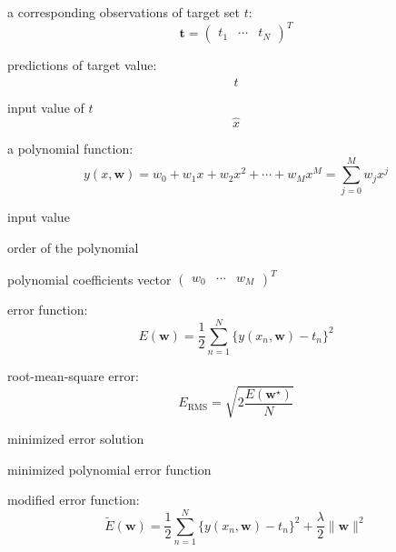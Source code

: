 \documentclass[11pt, a4paper, oneside]{article}
\begin{document}
a corresponding observations of target set $t$:
$$
\mathbf{t}
	= \begin{pmatrix}
	t_1 & \cdots & t_N
\end{pmatrix} ^T 
$$

\bigskip

predictions of target value:
$$
\hat{t}
$$

\bigskip

input value of $\hat{t}$
$$
\hat{x}
$$

\bigskip

a polynomial function:
\begin{equation}
y(x, \mathbf{w})
= w_0 + w_1x + w_2x^2 + \cdots + w_Mx^M
= \sum_{j=0}^M w_j x^j 
\tag{1.1}
\end{equation}

\begin{description}[labelwidth=\widthof{\bfseries 1234567890},align=parright]
	\item[$x:$] input value
	\item[$M:$] order of the polynomial
	\item[$\mathbf{w}:$] polynomial coefficients vector $\begin{pmatrix}
w_0 & \cdots & w_M
\end{pmatrix}^T$
\end{description}

\bigskip

error function:
\begin{equation}
E(\mathbf{w})
= \frac{1}{2} \sum_{n=1}^N \{ y(x_n, \mathbf{w}) - t_n\} ^2
\tag{1.2}
\end{equation}

\bigskip

root-mean-square error:
\begin{equation}
E_{\text{RMS}} = \sqrt{ 2\frac{E(\mathbf{w}^\star)}{N} }
\tag{1.3}
\end{equation}

\begin{description}[labelwidth=\widthof{\bfseries 1234567890},align=parright]
	\item[$\mathbf{w}^\star:$] minimized error solution
	\item[$ y(x, \mathbf{w}^\star ):$] minimized polynomial error function
\end{description}

\bigskip

modified error function:
\begin{equation}
\tilde{E}(\mathbf{w})
= \frac{1}{2} \sum_{n=1}^N \{ y(x_n, \mathbf{w}) - t_n \} ^2
+ \frac{\lambda}{2} \| \mathbf{w} \| ^2
\tag{1.4}
\end{equation}
\end{document}
